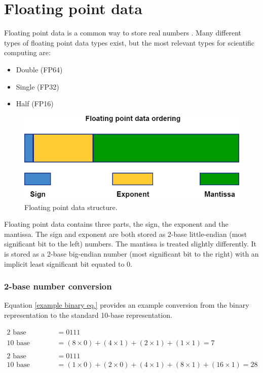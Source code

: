 \chapter{Floating point data}

\hspace{4mm}Floating point data is a common way to store real numbers . Many different types of floating point data types exist, but the most relevant types for scientific computing are:

\begin{itemize}
    \item Double (FP64)
    \item Single (FP32)
    \item Half (FP16)
\end{itemize}

\begin{figure}[h!]
    \includegraphics[width=0.6\linewidth]{figures/Float.png}
    \centering
    \caption{Floating point data structure.}
    \label{FP data}
\end{figure}

\vspace{5mm}

Floating point data contains three parts, the sign, the exponent and the mantissa. The sign and exponent are both stored as 2-base little-endian (most significant bit to the left) numbers. The mantissa is treated slightly differently. It is stored as a 2-base big-endian number (most significant bit to the right) with an implicit least significant bit equated to 0.

\subsection*{2-base number conversion}

Equation \ref{example binary eq.} provides an example conversion from the binary representation to the standard 10-base representation.

\begin{equation} \label{example binary eq.}
    \begin{split}
        \text{2 base sign/exponent} & = 0111 \\
        \text{10 base sign/exponent} & =  (8 \times 0) + (4 \times 1) + (2 \times 1) + (1 \times 1) =  7 \\
        \\
        \text{2 base mantissa} & = 0111 \\
        \text{10 base mantissa} & =  (1 \times 0) + (2 \times 0) + (4 \times 1) + (8 \times 1) + (16 \times 1) = 28 
    \end{split}
\end{equation}

